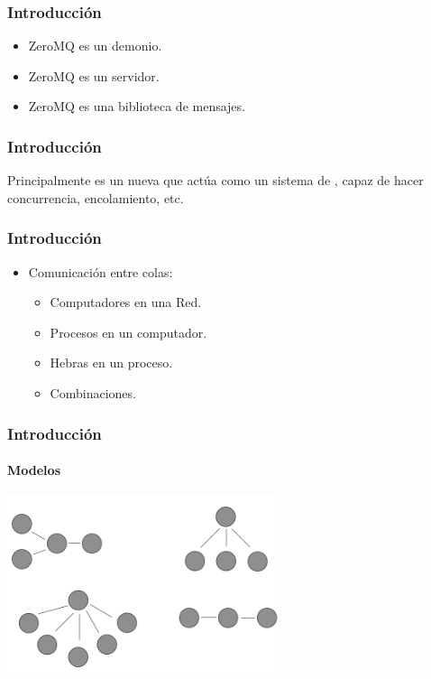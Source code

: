 \begin{frame}
    \frametitle{Introducción}
    \begin{itemize}
        \item ZeroMQ  es un demonio.
        \item ZeroMQ  es un servidor.
        \item ZeroMQ es una biblioteca de mensajes.
    \end{itemize}
\end{frame}

\begin{frame}
    \frametitle{Introducción}
    \begin{center}
        Principalmente es un nueva  que actúa
        como un sistema de ,
        capaz de hacer concurrencia, encolamiento, etc.
    \end{center}
\end{frame}

\begin{frame}
    \frametitle{Introducción}
    \begin{itemize}
        \item Comunicación entre colas:
        \begin{itemize}
            \item Computadores en una Red.
            \item Procesos en un computador.
            \item Hebras en un proceso.
            \item Combinaciones.
        \end{itemize}
    \end{itemize}
\end{frame}


\begin{frame}
    \frametitle{Introducción}
    \framesubtitle{Modelos}
    \begin{center}
        \includegraphics[width=0.6\textwidth]{img/modelos}
    \end{center}
\end{frame}

